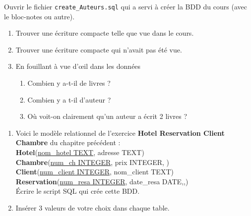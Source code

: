 \documentclass[a4paper,12pt,french]{article}
\begin{document}
\begin{exercice}[]
Ouvrir le fichier \texttt{create\_Auteurs.sql} qui a servi à créer la BDD du cours (avec le bloc-notes ou autre).
\begin{enumerate}[\bfseries 1.]
	\item 	Trouver une écriture compacte telle que vue dans le cours.
	\item 	Trouver une écriture compacte qui n'avait pas été vue.
    \item 	En fouillant \og à vue d'\oe il\fg{} dans les données
    \begin{enumerate}[\bfseries a.]
    	\item 	Combien y a-t-il de livres ?
    	\item 	Combien y a t-il d'auteur ?
        \item 	Où voit-on clairement qu'un auteur a écrit 2 livres ?
    \end{enumerate}
\end{enumerate}
\end{exercice}
\begin{exercice}[]
\begin{enumerate}[\bfseries 1.]
	\item Voici le modèle relationnel de l'exercice \textbf{Hotel Reservation Client Chambre} du chapitre précédent :\\

    \textbf{Hotel}(\uline{nom\_hotel TEXT}, adresse TEXT)\\

    \textbf{Chambre}(\uline{num\_ch INTEGER}, prix INTEGER, )\\

    \textbf{Client}(\uline{num\_client INTEGER}, nom\_client TEXT)\\


    \textbf{Reservation}(\uline{num\_resa INTEGER}, date\_resa DATE,,)\\

    Écrire le script SQL qui crée cette BDD.
    \item Insérer 3 valeurs de votre choix dans chaque table.
\end{enumerate}
\end{exercice}
\end{document}
